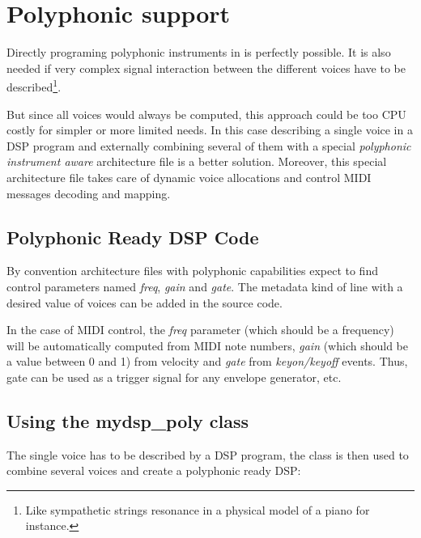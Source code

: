 \chapter{Polyphonic support} \label{sec:poly}

Directly programing polyphonic instruments in \faust is perfectly possible. It is also needed if very complex signal interaction between the different voices have to be described\footnote{Like sympathetic strings resonance in a physical model of a piano for instance.}.

But since all voices would always be computed, this approach could be too CPU costly for simpler or more limited needs. In this case describing a single voice in a \faust DSP program and externally combining several of them with a special  {\it polyphonic instrument aware} architecture file is a better solution. Moreover, this special architecture file takes care of dynamic voice allocations and control MIDI messages decoding and mapping.

\section{Polyphonic Ready DSP Code}

By convention \faust architecture files with polyphonic capabilities expect to find control parameters named {\it freq}, {\it gain} and {\it gate}.  The metadata    kind of line with a desired value of  voices can be added in the source code.

In the case of MIDI control, the {\it freq} parameter (which should be a frequency) will be automatically computed from MIDI note numbers, {\it gain} (which should be a value between 0 and 1) from velocity and {\it gate} from {\it keyon/keyoff} events. Thus, gate can be used as a trigger signal for any envelope generator, etc.

\section{Using the mydsp\_poly class}

The single voice has to be described by a \faust DSP program, the  class is then used to combine several voices and create a polyphonic ready DSP:

